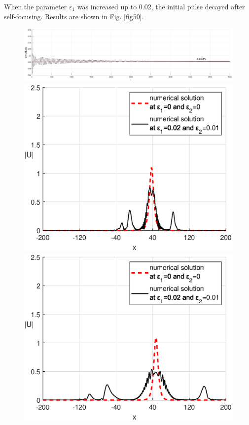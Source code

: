\documentclass[preprint,12pt]{elsarticle}
\begin{document}
When the parameter \(\varepsilon_{1}\) was increased up to 0.02, the initial pulse decayed after self-focusing. Results are shown in Fig. \ref{fig50}.
\begin{figure}[H]%
\begin{center}
\begin{minipage}[h]{0.48\linewidth}
\includegraphics[width=1\linewidth]{fig37.eps}
\end{minipage}
\hfill
\begin{minipage}[h]{0.48\linewidth}
\includegraphics[width=1\linewidth]{fig38.eps}
\end{minipage}
\hfill
\begin{minipage}[h]{0.48\linewidth}
\includegraphics[width=1\linewidth]{fig39.eps}

\end{minipage}
\end{center}
\end{figure}
\end{document}
